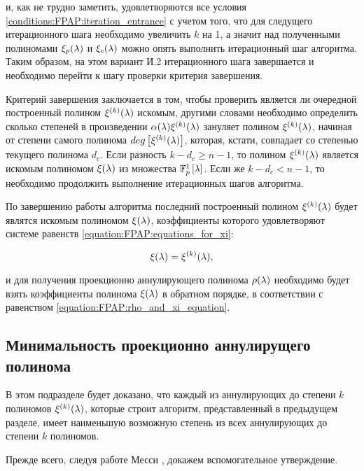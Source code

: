 и, как не трудно заметить, удовлетворяются все условия \ref{conditions:FPAP:iteration_entrance} с учетом того, что для следущего итерационного
шага необходимо увеличить $k$ на 1, а значит над полученными полиномами $\xi_p (\lambda)$ и $\xi_c (\lambda)$ можно опять выполнить
итерационный шаг алгоритма. Таким образом, на этом вариант И.2 итерационного шага завершается и необходимо перейти к шагу проверки
критерия завершения.

Критерий завершения заключается в том, чтобы проверить является ли очередной построенный полином $\xi^{(k)} (\lambda)$ искомым, другими
словами необходимо определить сколько степеней в произведении $\alpha (\lambda) \xi^{(k)} (\lambda)$ зануляет полином
$\xi^{(k)} (\lambda)$, начиная от степени самого полинома $deg \left [ \xi^{(k)} (\lambda) \right ]$, которая, кстати, совпадает со степенью текущего
полинома $d_c$. Если разность $k - d_c \ge n-1$, то полином $\xi^{(k)} (\lambda)$ является искомым полиномом $\xi (\lambda)$ из
множества $\mathbb{F}_p^1 \left [ \lambda \right ]$. Если же $k - d_c < n-1$, то необходимо продолжить выполнение итерационных шагов алгоритма.

По завершению работы алгоритма последний построенный полином $\xi^{(k)} (\lambda)$ будет являтся искомым полиномом $\xi (\lambda)$,
коэффициенты которого удовлетворяют системе равенств \eqref{equation:FPAP:equations_for_xi}:

	$$ \xi (\lambda) = \xi^{(k)} (\lambda), $$

и для получения проекционно аннулирующего полинома $\rho (\lambda)$ необходимо будет взять коэффициенты полинома $\xi (\lambda)$
в обратном порядке, в соответствии с равенством \eqref{equation:FPAP:rho_and_xi_equation}.

\subsection{Минимальность проекционно аннулирущего полинома} \label{section:MDAP:minimal_degree_of_annihilating_polynomial}

В этом подразделе будет доказано, что каждый из аннулирующих до степени $k$ полиномов $\xi^{(k)} (\lambda)$, которые строит алгоритм,
представленный в предыдущем разделе, имеет наименьшую возможную степень из всех аннулирующих до степени $k$ полиномов.

Прежде всего, следуя работе Месси \cite{Massey}, докажем вспомогательное утверждение.

